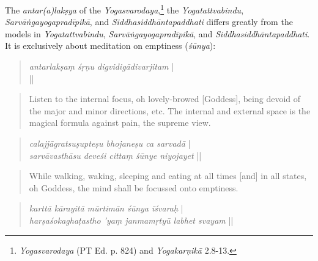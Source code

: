 The \textit{antar(a)lakṣya} of the \textit{Yogasvarodaya},\footnote{\textit{Yogasvarodaya} (PT Ed. p. 824) and \textit{Yogakarṇikā} 2.8-13.} the \textit{Yogatattvabindu}, \textit{Sarvāṅgayogapradīpikā}, and \textit{Siddhasiddhāntapaddhati} differs greatly from the models in \textit{Yogatattvabindu}, \textit{Sarvāṅgayogapradīpikā}, and \textit{Siddhasiddhāntapaddhati}. It is exclusively about meditation on emptiness (\textit{śūnya}): 

\label{antarsvayotrans}
  \begin{quote}
    \begin{ekdosis}
    \textit{
  antarlakṣaṃ śṛṇu digvidigādivarjitam} |\\
\textit{
} ||
  \end{ekdosis}
\end{quote}
\begin{quote}
Listen to the internal focus, oh lovely-browed [Goddess], being devoid of the major and minor directions, etc. The internal and external space is the magical formula against pain, the supreme view.
\end{quote}
\begin{quote}
  \begin{ekdosis}
\textit{calajjāgratsuṣupteṣu bhojaneṣu ca sarvadā} |\\
\textit{sarvāvasthāsu deveśi cittaṃ śūnye niyojayet} ||
  \end{ekdosis}
\end{quote}
\begin{quote}
While walking, waking, sleeping and eating at all times
[and] in all states, oh Goddess, the mind shall be focussed onto emptiness.  
\end{quote}
\begin{quote}
  \begin{ekdosis}
    \textit{karttā kārayitā mūrtimān śūnya īśvaraḥ} |\\
    \textit{harṣaśokaghaṭastho ’yaṃ janmamṛtyū labhet svayam} ||
      \end{ekdosis}
\end{quote}
